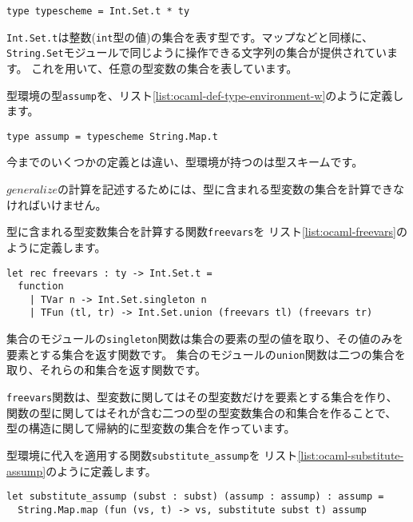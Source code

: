 \begin{lstlisting}[caption=型スキームの定義, label=list:ocaml-def-type-scheme]
type typescheme = Int.Set.t * ty
\end{lstlisting}

\texttt{Int.Set.t}は整数(\texttt{int}型の値)の集合を表す型です。マップなどと同様に、
\texttt{String.Set}モジュールで同じように操作できる文字列の集合が提供されています。
これを用いて、任意の型変数の集合を表しています。

型環境の型\texttt{assump}を、リスト\ref{list:ocaml-def-type-environment-w}のように定義します。

\begin{lstlisting}[caption=型環境の定義, label=list:ocaml-def-type-environment-w]
type assump = typescheme String.Map.t
\end{lstlisting}

今までのいくつかの定義とは違い、型環境が持つのは型スキームです。

$\mathit{generalize}$の計算を記述するためには、型に含まれる型変数の集合を計算できなければいけません。

型に含まれる型変数集合を計算する関数\texttt{freevars}を
リスト\ref{list:ocaml-freevars}のように定義します。

\begin{lstlisting}[caption=型に含まれる型変数集合の計算, label=list:ocaml-freevars]
let rec freevars : ty -> Int.Set.t =
  function
    | TVar n -> Int.Set.singleton n
    | TFun (tl, tr) -> Int.Set.union (freevars tl) (freevars tr)
\end{lstlisting}

集合のモジュールの\texttt{singleton}関数は集合の要素の型の値を取り、その値のみを要素とする集合を返す関数です。
集合のモジュールの\texttt{union}関数は二つの集合を取り、それらの和集合を返す関数です。

\texttt{freevars}関数は、型変数に関してはその型変数だけを要素とする集合を作り、
関数の型に関してはそれが含む二つの型の型変数集合の和集合を作ることで、
型の構造に関して帰納的に型変数の集合を作っています。

型環境に代入を適用する関数\texttt{substitute\_assump}を
リスト\ref{list:ocaml-substitute-assump}のように定義します。

\begin{lstlisting}[caption=型環境に代入を適用, label=list:ocaml-substitute-assump]
let substitute_assump (subst : subst) (assump : assump) : assump =
  String.Map.map (fun (vs, t) -> vs, substitute subst t) assump
\end{lstlisting}

